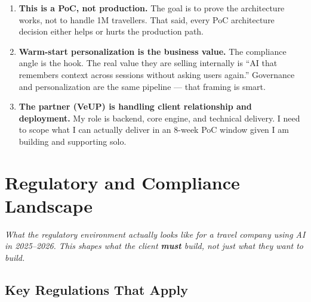 \documentclass[11pt, a4paper]{article}
\begin{document}
\begin{enumerate}[leftmargin=*, label=\textbf{\arabic*.}]
  \item \textbf{This is a PoC, not production.}
  The goal is to prove the architecture works, not to handle 1M travellers. That said,
  every PoC architecture decision either helps or hurts the production path.

  \item \textbf{Warm-start personalization is the business value.}
  The compliance angle is the hook. The real value they are selling internally is
  ``AI that remembers context across sessions without asking users again.''
  Governance and personalization are the same pipeline --- that framing is smart.

  \item \textbf{The partner (VeUP) is handling client relationship and deployment.}
  My role is backend, core engine, and technical delivery. I need to scope what I can
  actually deliver in an 8-week PoC window given I am building and supporting solo.

\end{enumerate}

\newpage
\section{Regulatory and Compliance Landscape}

\begin{notebox}
\textit{What the regulatory environment actually looks like for a travel company using AI in 2025--2026. This shapes what the client \textbf{must} build, not just what they want to build.}
\end{notebox}

\vspace{0.5em}

\subsection{Key Regulations That Apply}
\end{document}
